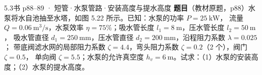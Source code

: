 \begin{liti}{5.3}{书 p88--89 · 短管·水泵管路·安装高度与提水高度}
\textbf{题目}（教材原题，p88）水泵将水自池抽至水塔，如图 5.22 所示。已知：水泵的功率 $P=25\ \mathrm{kW}$，
流量 $Q=0.06\ \mathrm{m^3/s}$，水泵效率 $\eta=75\%$；吸水管长度 $l_1=8\ \mathrm{m}$，压水管长度 $l_2=50\ \mathrm{m}$，
吸水管直径 $d_1=250\ \mathrm{mm}$，压水管直径 $d_2=200\ \mathrm{mm}$，沿程阻力系数 $\lambda=0.025$；
带底阀滤水网的局部阻力系数 $\zeta=4.4$，弯头阻力系数 $\zeta=0.2$（2 个），阀门 $\zeta=0.5$，
单向阀 $\zeta=5.5$；水泵的允许真空度 $h_v=6\ \mathrm{m}$。试求：（1）水泵的安装高度；（2）水泵的提水高度。



\end{liti}
